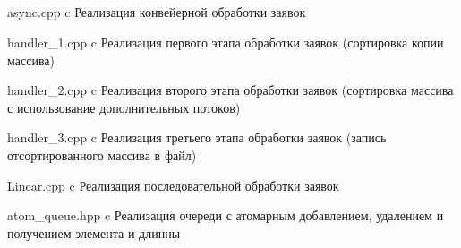 \begin{appendices}
	\chapter{}
	{async.cpp} %
	{c} %
	{Реализация конвейерной обработки заявок} %
	
	{handler_1.cpp} %
	{c} %
	{Реализация первого этапа обработки заявок (сортировка копии массива)} %
	
	{handler_2.cpp} %
	{c} %
	{Реализация второго этапа обработки заявок (сортировка массива с использование дополнительных потоков)} %
	
	{handler_3.cpp} %
	{c} %
	{Реализация третьего этапа обработки заявок (запись отсортированного массива в файл)} %
	
	{Linear.cpp} %
	{c} %
	{Реализация последовательной обработки заявок} %
	
	{atom_queue.hpp} %
	{c} %
	{Реализация очереди с атомарным добавлением, удалением и получением элемента и длинны} %
\end{appendices}
	
	
	
